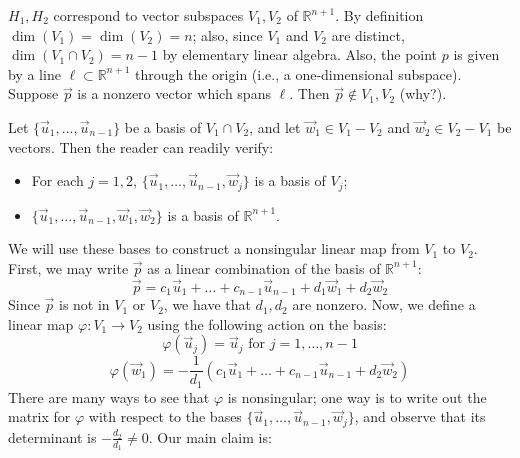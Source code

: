 \documentclass[leqno]{book}
\begin{document}
$H_1,H_2$ correspond to vector subspaces $V_1,V_2$ of $\mathbb R^{n+1}$.  By definition $\dim(V_1)=\dim(V_2)=n$; also, since $V_1$ and $V_2$ are distinct, $\dim(V_1\cap V_2)=n-1$ by elementary linear algebra.  Also, the point $p$ is given by a line $\ell\subset\mathbb R^{n+1}$ through the origin (i.e., a one-dimensional subspace).  Suppose $\vec p$ is a nonzero vector which spans $\ell$.  Then $\vec p\notin V_1,V_2$ (why?).

Let $\{\vec u_1,\dots,\vec u_{n-1}\}$ be a basis of $V_1\cap V_2$, and let $\vec w_1\in V_1-V_2$ and $\vec w_2\in V_2-V_1$ be vectors.  Then the reader can readily verify:
\begin{itemize}
\item For each $j=1,2$, $\{\vec u_1,\dots,\vec u_{n-1},\vec w_j\}$ is a basis of $V_j$;

\item $\{\vec u_1,\dots,\vec u_{n-1},\vec w_1,\vec w_2\}$ is a basis of $\mathbb R^{n+1}$.
\end{itemize}
We will use these bases to construct a nonsingular linear map from $V_1$ to $V_2$.  First, we may write $\vec p$ as a linear combination of the basis of $\mathbb R^{n+1}$:
$$\vec p=c_1\vec u_1+\dots+c_{n-1}\vec u_{n-1}+d_1\vec w_1+d_2\vec w_2$$
Since $\vec p$ is not in $V_1$ or $V_2$, we have that $d_1,d_2$ are nonzero.  Now, we define a linear map $\varphi:V_1\to V_2$ using the following action on the basis:
$$\varphi(\vec u_j)=\vec u_j\text{ for }j=1,\dots,n-1$$
$$\varphi(\vec w_1)=-\frac 1{d_1}(c_1\vec u_1+\dots+c_{n-1}\vec u_{n-1}+d_2\vec w_2)$$ %
There are many ways to see that $\varphi$ is nonsingular; one way is to write out the matrix for $\varphi$ with respect to the bases $\{\vec u_1,\dots,\vec u_{n-1},\vec w_j\}$, and observe that its determinant is $-\frac{d_2}{d_1}\ne 0$.  Our main claim is:\\
\end{document}

